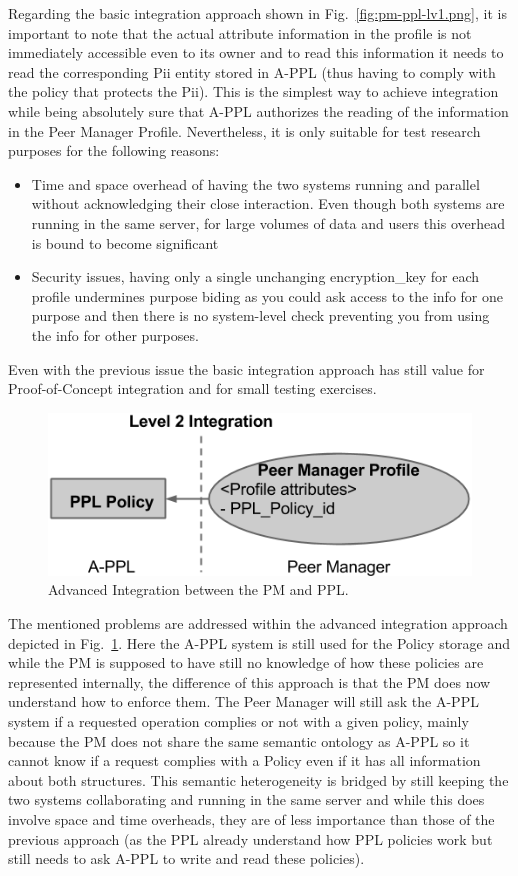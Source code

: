 Regarding the basic integration approach shown in Fig.~\ref{fig:pm-ppl-lv1.png}, it is important to note that the actual attribute information in the profile is not immediately accessible even to its owner and to read this information it needs to read the corresponding Pii entity stored in A-PPL (thus having to comply with the policy that protects the Pii). This is the simplest way to achieve integration while being absolutely sure that A-PPL authorizes the reading of the information in the Peer Manager Profile. Nevertheless, it is only suitable for test research purposes for the following reasons:
\begin{itemize}
	\item Time and space overhead of having the two systems running and parallel without acknowledging their close interaction. Even though both systems are running in the same server, for large volumes of data and users this overhead is bound to become significant
	\item Security issues, having only a single unchanging encryption\_key for each profile undermines purpose biding as you could ask access to the info for one purpose and then there is no system-level check preventing you from using the info for other purposes.
\end{itemize}

Even with the previous issue the basic integration approach has still value for Proof-of-Concept integration and for small testing exercises. 

\begin{figure}[htb!]
\centering
\includegraphics[width=0.6\linewidth]{figures/pm-ppl-lv2.png}
\caption{Advanced Integration between the PM and PPL.}
\label{fig:pm-ppl-lv2.png}
\end{figure}

The mentioned problems are addressed within the advanced integration approach depicted in Fig.~\ref{fig:pm-ppl-lv2.png}. Here the A-PPL system is still used for the Policy storage and while the PM is supposed to have still no knowledge of how these policies are represented internally, the difference of this approach is that the PM does now understand how to enforce them. The Peer Manager will still ask the A-PPL system if a requested operation complies or not with a given policy, mainly because the PM does not share the same semantic ontology as A-PPL so it cannot know if a request complies with a Policy even if it has all information about both structures. This semantic heterogeneity is bridged by still keeping the two systems collaborating and running in the same server and while this does involve space and time overheads, they are of less importance than those of the previous approach (as the PPL already understand how PPL policies work but still needs to ask A-PPL to write and read these policies).

